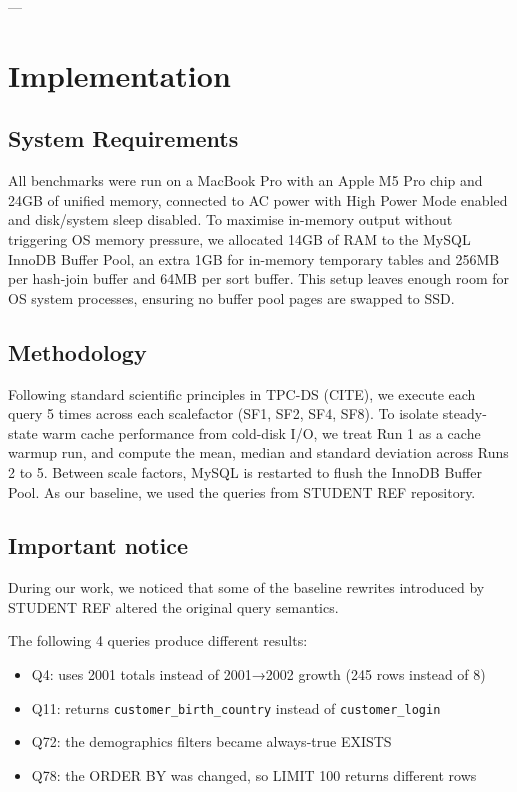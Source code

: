 \documentclass{ULBreport}
\begin{document}
---

\section{Implementation}
\subsection{System Requirements}
All benchmarks were run on a MacBook Pro with an Apple M5 Pro chip and 24GB of unified memory, connected to AC power with High Power Mode enabled and disk/system sleep disabled. To maximise in-memory output without triggering OS memory pressure, we allocated 14GB of RAM to the MySQL InnoDB Buffer Pool, an extra 1GB for in-memory temporary tables and 256MB per hash-join buffer and 64MB per sort buffer. This setup leaves enough room for OS system processes, ensuring no buffer pool pages are swapped to SSD.
\subsection{Methodology}
Following standard scientific principles in TPC-DS (CITE), we execute each query 5 times across each scalefactor (SF1, SF2, SF4, SF8). To isolate steady-state warm cache performance from cold-disk I/O, we treat Run 1 as a cache warmup run, and compute the mean, median and standard deviation across Runs 2 to 5. Between scale factors, MySQL is restarted to flush the InnoDB Buffer Pool. As our baseline, we used the queries from STUDENT REF repository. 
\subsection{Important notice}
During our work, we noticed that some of the baseline rewrites introduced by STUDENT REF altered the original query semantics. 

The following 4 queries produce different results:


\begin{itemize}
    \item Q4: uses 2001 totals instead of 2001→2002 growth (245 rows instead of 8)
    \item Q11: returns \texttt{customer\_birth\_country} instead of \texttt{customer\_login}
    \item Q72: the demographics filters became always-true EXISTS
    \item Q78: the ORDER BY was changed, so LIMIT 100 returns different rows
\end{itemize}
\end{document}
